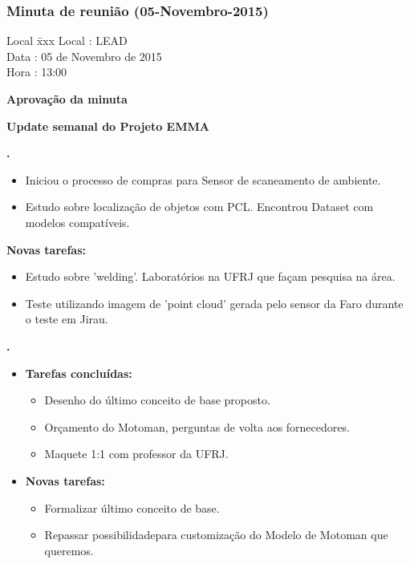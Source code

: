 \subsubsection{Minuta de reunião (05-Novembro-2015)}

\begin{tabbing}
  Local \= xxx \kill
  Local \> : LEAD \\
  Data  \> : 05 de Novembro de 2015 \\
  Hora  \> : 13:00
\end{tabbing} 


\textbf{Aprovação da minuta}

\textbf{Update semanal do Projeto EMMA}
   									
						
\textbf{\gabriel.} 
	\begin{itemize}
			\item Iniciou o processo de compras para Sensor de scaneamento de
			ambiente.
			\item Estudo sobre localização de objetos com PCL. Encontrou Dataset com
			modelos compatíveis.
			\end{itemize}
		
		\item \textbf{Novas tarefas:}
			\begin{itemize} 
				\item Estudo sobre 'welding'. Laboratórios na UFRJ que façam pesquisa na
				área.
				\item Teste utilizando imagem de 'point cloud' gerada pelo sensor da Faro
				durante o teste em Jirau.
			\end{itemize}

					
			
   \textbf{.} 
	\begin{itemize}
		\item \textbf{Tarefas concluídas:}
			\begin{itemize}    
			    \item Desenho do último conceito de base proposto.
				\item Orçamento do Motoman, perguntas de volta aos fornecedores.
				\item Maquete 1:1 com professor da UFRJ.
				
			\end{itemize}
		
		\item \textbf{Novas tarefas:}
			\begin{itemize} 
			    \item Formalizar último conceito de base.
			    \item Repassar possibilidadepara customização do Modelo de Motoman que
			    queremos.
			\end{itemize}
	\end{itemize}

